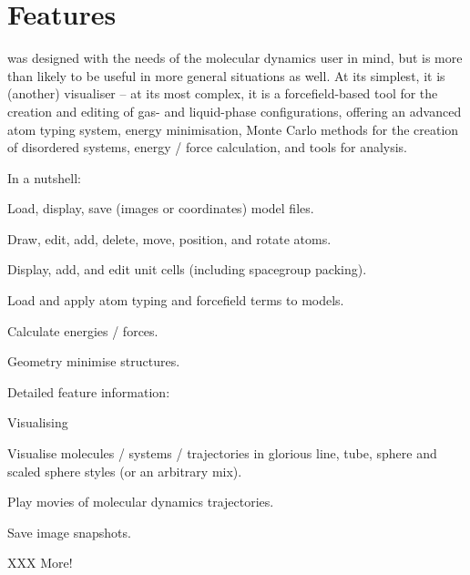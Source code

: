 \chapter{Features}

\progname{} was designed with the needs of the molecular dynamics user in mind, but is more than likely to be useful in more general situations as well. At its simplest, it is (another) visualiser -- at its most complex, it is a forcefield-based tool for the creation and editing of gas- and liquid-phase configurations, offering an advanced atom typing system, energy minimisation, Monte Carlo methods for the creation of disordered systems, energy / force calculation, and tools for analysis.\\

\begin{optlist}{In a nutshell:}
	\item Load, display, save (images or coordinates) model files.
	\item Draw, edit, add, delete, move, position, and rotate atoms.
	\item Display, add, and edit unit cells (including spacegroup packing).
	\item Load and apply atom typing and forcefield terms to models.
	\item Calculate energies / forces.
	\item Geometry minimise structures.
\end{optlist}

Detailed feature information:\\

\begin{optlist}{Visualising}
	\item Visualise molecules / systems / trajectories in glorious line, tube, sphere and scaled sphere styles (or an arbitrary mix).
	\item Play movies of molecular dynamics trajectories.
	\item Save image snapshots.
\end{optlist}

XXX More!
